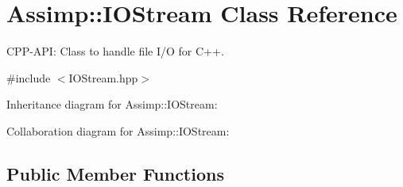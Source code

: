 \hypertarget{class_assimp_1_1_i_o_stream}{\section{Assimp\+:\+:I\+O\+Stream Class Reference}
\label{class_assimp_1_1_i_o_stream}
}


C\+P\+P-\/\+A\+P\+I\+: Class to handle file I/\+O for C++.  




{\ttfamily \#include $<$I\+O\+Stream.\+hpp$>$}



Inheritance diagram for Assimp\+:\+:I\+O\+Stream\+:


Collaboration diagram for Assimp\+:\+:I\+O\+Stream\+:
\subsection*{Public Member Functions}
